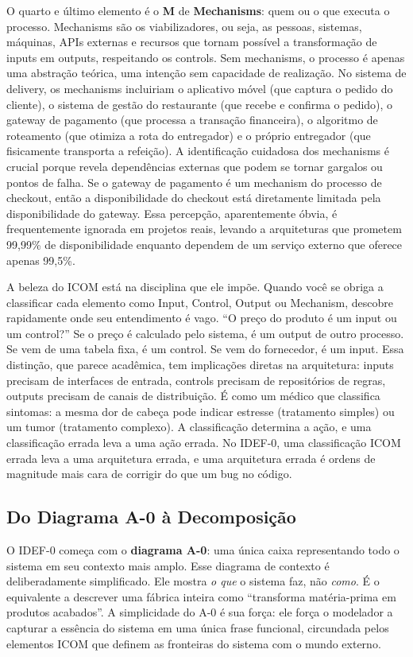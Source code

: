 O quarto e último elemento é o \textbf{M} de \textbf{Mechanisms}: quem ou o que
executa o processo. Mechanisms são os viabilizadores, ou seja, as pessoas, sistemas,
máquinas, APIs externas e recursos que tornam possível a transformação de inputs em
outputs, respeitando os controls. Sem mechanisms, o processo é apenas uma abstração
teórica, uma intenção sem capacidade de realização. No sistema de delivery, os
mechanisms incluiriam o aplicativo móvel (que captura o pedido do cliente), o sistema
de gestão do restaurante (que recebe e confirma o pedido), o gateway de pagamento
(que processa a transação financeira), o algoritmo de roteamento (que otimiza a rota
do entregador) e o próprio entregador (que fisicamente transporta a refeição). A
identificação cuidadosa dos mechanisms é crucial porque revela dependências externas
que podem se tornar gargalos ou pontos de falha. Se o gateway de pagamento é um
mechanism do processo de checkout, então a disponibilidade do checkout está
diretamente limitada pela disponibilidade do gateway. Essa percepção, aparentemente
óbvia, é frequentemente ignorada em projetos reais, levando a arquiteturas que
prometem 99,99\% de disponibilidade enquanto dependem de um serviço externo que
oferece apenas 99,5\%.

A beleza do ICOM está na disciplina que ele impõe. Quando você se obriga a
classificar cada elemento como Input, Control, Output ou Mechanism, descobre
rapidamente onde seu entendimento é vago. ``O preço do produto é um input ou um
control?'' Se o preço é calculado pelo sistema, é um output de outro processo.
Se vem de uma tabela fixa, é um control. Se vem do fornecedor, é um input. Essa
distinção, que parece acadêmica, tem implicações diretas na arquitetura: inputs
precisam de interfaces de entrada, controls precisam de repositórios de regras,
outputs precisam de canais de distribuição. É como um médico que classifica
sintomas: a mesma dor de cabeça pode indicar estresse (tratamento simples) ou
um tumor (tratamento complexo). A classificação determina a ação, e uma
classificação errada leva a uma ação errada. No IDEF-0, uma classificação ICOM
errada leva a uma arquitetura errada, e uma arquitetura errada é ordens de
magnitude mais cara de corrigir do que um bug no código.

\subsection{Do Diagrama A-0 à Decomposição}

O IDEF-0 começa com o \textbf{diagrama A-0}: uma única caixa representando todo o
sistema em seu contexto mais amplo. Esse diagrama de contexto é deliberadamente
simplificado. Ele mostra \emph{o que} o sistema faz, não \emph{como}. É o
equivalente a descrever uma fábrica inteira como ``transforma matéria-prima em
produtos acabados''. A simplicidade do A-0 é sua força: ele força o modelador a
capturar a essência do sistema em uma única frase funcional, circundada pelos
elementos ICOM que definem as fronteiras do sistema com o mundo externo.

